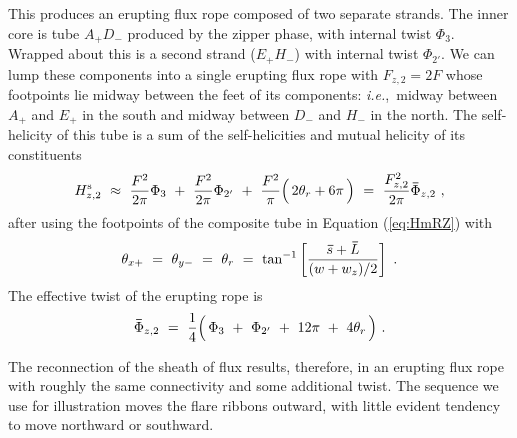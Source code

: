 \documentclass[10pt,namedreferneces]{SolarPhysics}
\begin{document}
\begin{article}
This produces an erupting flux rope composed of two separate strands.  The inner core is tube $A_+D_-$ produced by the zipper phase, with internal twist $\Phi_3$.  Wrapped about this is a second strand ($E_+H_-$) with internal twist $\Phi_{2'}$.  We can lump these components into a single erupting flux rope with $F_{z,2}=2F$ whose footpoints lie midway between the feet of its components: \textit{i.e.},\ midway between $A_+$ and $E_+$ in the south and midway between $D_-$ and $H_-$ in the north.  The self-helicity of this tube is a sum of the self-helicities and mutual helicity of its constituents
\begin{equation}
  H^{\rm s}_{z,2} ~\approx~ {F^2\over2\pi}\Phi_3 ~+~ {F^2\over 2\pi}\Phi_{2'} ~+~ {F^2\over \pi}\Bigl(\, 2\theta_{r}+6\pi\,\Bigr) ~=~ {F_{z,2}^2\over2\pi}\bm\bar{\Phi}_{z,2} ~,
  	\label{eq:Phiz1}
\end{equation}
after using the footpoints of the composite tube in Equation  (\ref{eq:HmRZ}) with 
\begin{equation}
  \theta_{x+}~=~\theta_{y-}~=~ \theta_r ~=~\tan^{-1}\left[{\bm\bar{s}+\bm\bar{L}\over (w+w_z)/2}\right] ~.
\end{equation}
The effective twist of the erupting rope is 
\begin{equation}
  \bm\bar{\Phi}_{z,2} ~=~ {1\over4}\Bigl(\, \Phi_3 ~+~\Phi_{2'} ~+~ 12\pi~+~4\theta_r\,\Bigr) ~.
  	\label{eq:Phiz2}
\end{equation}

The reconnection of the sheath of flux results, therefore, in an erupting flux rope with roughly the same connectivity and some additional twist.  The sequence we use for illustration  moves the flare ribbons outward, with little evident tendency to move northward or southward.  


\end{article}
\end{document}
